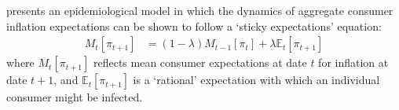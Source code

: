 

\cite{carroll2003macroeconomic} presents an epidemiological model in which the dynamics of aggregate consumer inflation expectations can be shown to follow a `sticky expectations' equation:
    \begin{align}
        M_{t}[\pi_{t+1}] & = (1-\lambda)M_{t-1}[\pi_{t}]+\lambda \mathbb{E}_{t}[\pi_{t+1}] \label{eq:StickyExp}
    \end{align}
where $M_{t}[\pi_{t+1}]$ reflects mean consumer expectations at date $t$ for inflation at date $t+1$, and $\mathbb{E}_{t}[\pi_{t+1}]$ is a `rational' expectation with which an individual consumer might be infected.



